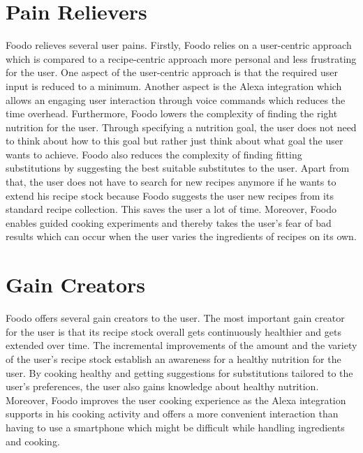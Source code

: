 \section{Pain Relievers}
Foodo relieves several user pains. Firstly, Foodo relies on a user-centric approach which is compared to a recipe-centric approach more personal and less frustrating for the user. One aspect of the user-centric approach is that the required user input is reduced to a minimum. Another aspect is the Alexa integration which allows an engaging user interaction through voice commands which reduces the time overhead. Furthermore, Foodo lowers the complexity of finding the right nutrition for the user. Through specifying a nutrition goal, the user does not need to think about how to this  goal but rather just think about what goal the user wants to achieve. Foodo also reduces the complexity of finding fitting substitutions by suggesting the best suitable substitutes to the user. Apart from that, the user does not have to search for new recipes anymore if he wants to extend his recipe stock because Foodo suggests the user new recipes from its standard recipe collection. This saves the user a lot of time. Moreover, Foodo enables guided cooking experiments and thereby takes the user's fear of bad results which can occur when the user varies the ingredients of recipes on its own.


\section{Gain Creators}
Foodo offers several gain creators to the user. The most important gain creator for the user is that its recipe stock overall gets continuously healthier and gets extended over time. The incremental improvements of the amount and the variety of the user's recipe stock establish an awareness for a healthy nutrition for the user. By cooking healthy and getting suggestions for substitutions tailored to the user's preferences, the user also gains knowledge about healthy nutrition. Moreover, Foodo improves the user cooking experience as the Alexa integration supports in his cooking activity and offers a more convenient interaction than having to use a smartphone which might be difficult while handling ingredients and cooking.


